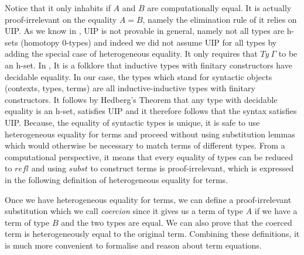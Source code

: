 Notice that it only inhabits if $A$ and $B$ are computationally equal.
It is actually proof-irrelevant on the equality $A = B$, namely the elimination rule of it relies on UIP.
As we know in \itt, UIP is not provable in general, namely not all types are h-sets (homotopy
0-types) and indeed we did not assume UIP for all types by adding the special case of heterogeneous equality. It only requires that $Ty ~\Gamma$ to be an h-set. In \itt,
It is a folklore that inductive types with finitary constructors have decidable equality. In
our case, the types which stand for syntactic objects (contexts,
types, terms) are all inductive-inductive types with finitary
constructors. It follows by Hedberg's Theorem \cite{hed:98} that any
type with decidable equality is an h-set, satisfies UIP and it therefore follows
that the syntax satisfies UIP. Because, the equality of syntactic
types is unique, it is safe to use heterogeneous equality for terms and proceed
without using substitution lemmas which would otherwise be necessary
to match terms of different types. 
From a computational perspective, it means that every equality of types can be reduced to
$\mathit{refl}$ and using $\mathit{subst}$ to construct terms is
proof-irrelevant, which is expressed in the following definition of
heterogeneous equality for terms.


Once we have heterogeneous equality for terms, we can define a proof-irrelevant substitution which we call \emph{coercion} since it gives us a term of type $A$ if we have a term of type $B$ and the
two types are equal. We can also prove that the coerced term is heterogeneously equal to the
original term. Combining these definitions, it is much
more convenient to formalise and reason about term equations.

